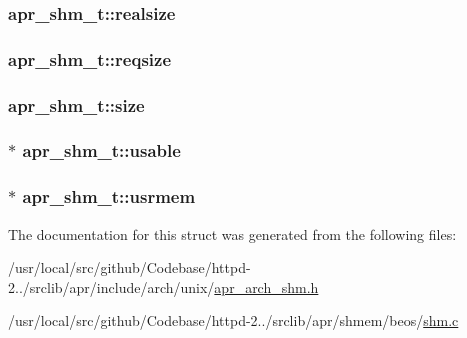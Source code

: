 \subsubsection[{\texorpdfstring{realsize}{realsize}}]{ apr\+\_\+shm\+\_\+t\+::realsize}\hypertarget{structapr__shm__t_a58326ee6b7743e11775d73697f301092}{}\label{structapr__shm__t_a58326ee6b7743e11775d73697f301092}
\subsubsection[{\texorpdfstring{reqsize}{reqsize}}]{ apr\+\_\+shm\+\_\+t\+::reqsize}\hypertarget{structapr__shm__t_aaede2c425028d3c30ca241da05675201}{}\label{structapr__shm__t_aaede2c425028d3c30ca241da05675201}
\subsubsection[{\texorpdfstring{size}{size}}]{ apr\+\_\+shm\+\_\+t\+::size}\hypertarget{structapr__shm__t_afea489d3983332f9ca2589b0a7b08572}{}\label{structapr__shm__t_afea489d3983332f9ca2589b0a7b08572}
\subsubsection[{\texorpdfstring{usable}{usable}}]{$\ast$ apr\+\_\+shm\+\_\+t\+::usable}\hypertarget{structapr__shm__t_a62857f13bb696ee6a90078614fcb9b4a}{}\label{structapr__shm__t_a62857f13bb696ee6a90078614fcb9b4a}
\subsubsection[{\texorpdfstring{usrmem}{usrmem}}]{$\ast$ apr\+\_\+shm\+\_\+t\+::usrmem}\hypertarget{structapr__shm__t_a67d8ec019dd578d675d2dfe3b5c68f9c}{}\label{structapr__shm__t_a67d8ec019dd578d675d2dfe3b5c68f9c}


The documentation for this struct was generated from the following files\+:\begin{DoxyCompactItemize}
\item 
/usr/local/src/github/\+Codebase/httpd-\/2../srclib/apr/include/arch/unix/\hyperlink{apr__arch__shm_8h}{apr\+\_\+arch\+\_\+shm.\+h}\item 
/usr/local/src/github/\+Codebase/httpd-\/2../srclib/apr/shmem/beos/\hyperlink{beos_2shm_8c}{shm.\+c}\end{DoxyCompactItemize}
